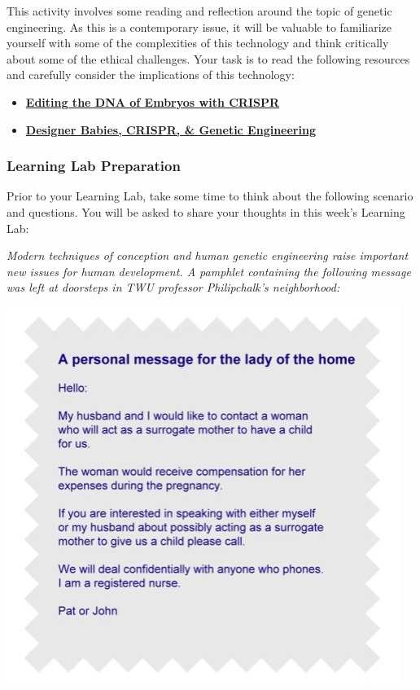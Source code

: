 \documentclass[
]{book}
\providecommand{\tightlist}{%
  \setlength{\itemsep}{0pt}\setlength{\parskip}{0pt}}
\begin{document}
This activity involves some reading and reflection around the topic of genetic engineering. As this is a contemporary issue, it will be valuable to familiarize yourself with some of the complexities of this technology and think critically about some of the ethical challenges. Your task is to read the following resources and carefully consider the implications of this technology:

\begin{itemize}
\tightlist
\item
  \href{https://www.statnews.com/2019/09/16/could-editing-the-dna-of-embryos-with-crispr-help-save-people-who-are-already-alive/}{\textbf{Editing the DNA of Embryos with CRISPR}}\\
\item
  \href{https://www.geneticsandsociety.org/internal-content/designer-babies-crispr-genetic-engineering}{\textbf{Designer Babies, CRISPR, \& Genetic Engineering}}
\end{itemize}

\hypertarget{learning-lab-preparation}{%
\subsubsection*{Learning Lab Preparation}\label{learning-lab-preparation}}

Prior to your Learning Lab, take some time to think about the following scenario and questions. You will be asked to share your thoughts in this week's Learning Lab:

\emph{Modern techniques of conception and human genetic engineer­ing raise important new issues for human development. A pam­phlet containing the following message was left at doorsteps in TWU professor Philipchalk's neighborhood:}

\includegraphics{assets/unit_3/U3_T1_LearningACtivitity.JPG}
\end{document}
